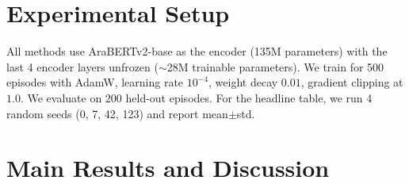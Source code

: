 \documentclass[11pt,a4paper,twocolumn]{article}
\begin{document}
\section{Experimental Setup}
\label{sec:exp}

All methods use AraBERTv2-base \citep{Antoun2020} as the encoder
(135M parameters) with the last 4 encoder layers unfrozen
($\sim$28M trainable parameters). We train for 500 episodes with
AdamW, learning rate $10^{-4}$, weight decay $0.01$, gradient
clipping at $1.0$. We evaluate on 200 held-out episodes. For
the headline table, we run 4 random seeds (0, 7, 42, 123) and
report mean$\pm$std.

\section{Main Results and Discussion}
\label{sec:results}
\end{document}
